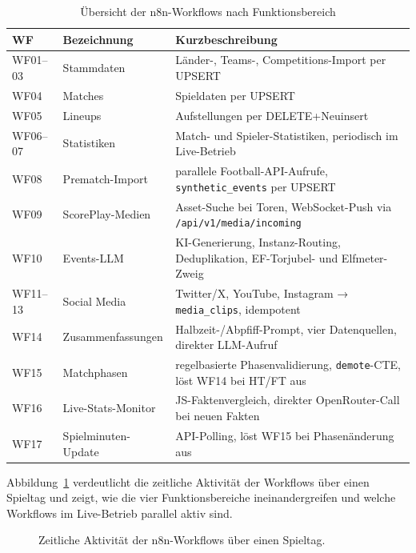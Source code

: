 {\small
\begin{longtable}[]{@{}
  >{\raggedright\arraybackslash}p{}
  >{\raggedright\arraybackslash}p{}
  >{\raggedright\arraybackslash}p{}@{}}
\caption{Übersicht der n8n-Workflows nach Funktionsbereich}\label{tab:n8n-workflow-overview}\\
\toprule\noalign{}
WF & Bezeichnung & Kurzbeschreibung \\
\midrule\noalign{}
\endhead
\bottomrule\noalign{}
\endlastfoot
WF01--03 & Stammdaten & Länder-, Teams-, Competitions-Import per UPSERT \\
WF04 & Matches & Spieldaten per UPSERT \\
WF05 & Lineups & Aufstellungen per DELETE+Neuinsert \\
WF06--07 & Statistiken & Match- und Spieler-Statistiken, periodisch im Live-Betrieb \\
WF08 & Prematch-Import & 5 parallele Football-API-Aufrufe, \texttt{synthetic\_events} per UPSERT \\
WF09 & ScorePlay-Medien & Asset-Suche bei Toren, WebSocket-Push via \texttt{/api/v1/media/incoming} \\
WF10 & Events-LLM & KI-Generierung, Instanz-Routing, Deduplikation, EF-Torjubel- und Elfmeter-Zweig \\
WF11--13 & Social Media & Twitter/X, YouTube, Instagram → \texttt{media\_clips}, idempotent \\
WF14 & Zusammenfassungen & Halbzeit-/Abpfiff-Prompt, vier Datenquellen, direkter LLM-Aufruf \\
WF15 & Matchphasen & regelbasierte Phasenvalidierung, \texttt{demote}-CTE, löst WF14 bei HT/FT aus \\
WF16 & Live-Stats-Monitor & JS-Faktenvergleich, direkter OpenRouter-Call bei neuen Fakten \\
WF17 & Spielminuten-Update & API-Polling, löst WF15 bei Phasenänderung aus \\
\end{longtable}
}

Abbildung~\ref{fig:workflow-timeline} verdeutlicht die zeitliche Aktivität der Workflows über einen Spieltag und zeigt, wie die vier Funktionsbereiche ineinandergreifen und welche Workflows im Live-Betrieb parallel aktiv sind.

\clearpage
\begin{figure}[H]
\centering
\resizebox{\textwidth}{!}{\DiagramWorkflowTimeline}
\caption[Zeitliche Aktivität der n8n-Workflows]{Zeitliche Aktivität der n8n-Workflows über einen Spieltag.}
\label{fig:workflow-timeline}
\end{figure}



